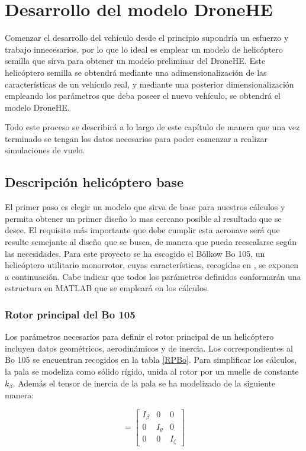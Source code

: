\chapter{Desarrollo del modelo DroneHE}


Comenzar el desarrollo del vehículo desde el principio supondría un esfuerzo y trabajo innecesarios, por lo que lo ideal es emplear un modelo de helicóptero semilla que sirva para obtener un modelo preliminar del DroneHE. Este helicóptero semilla se obtendrá mediante una adimensionalización de las características de un vehículo real, y mediante una posterior dimensionalización empleando los parámetros que deba poseer el nuevo vehículo, se obtendrá el modelo DroneHE.

Todo este proceso se describirá a lo largo de este capítulo de manera que una vez terminado se tengan los datos necesarios para poder comenzar a realizar simulaciones de vuelo.

\section{Descripción helicóptero base}

El primer paso es elegir un modelo que sirva de base para nuestros cálculos y permita obtener un primer diseño lo mas cercano posible al resultado que se desee. El requisito más importante que debe cumplir esta aeronave será que resulte semejante al diseño que se busca, de manera que pueda reescalarse según las necesidades. Para este proyecto se ha escogido el Bölkow Bo 105, un helicóptero utilitario monorrotor, cuyas características, recogidas en \citet{Padfield}, se exponen a continuación. Cabe indicar que todos los parámetros definidos conformarán una estructura en MATLAB que se empleará en los cálculos.

\subsection{Rotor principal del Bo 105}

Los parámetros necesarios para definir el rotor principal de un helicóptero incluyen datos geométricos, aerodinámicos y de inercia. Los correspondientes al Bo 105 se encuentran recogidos en la tabla \ref{RPBo}.
Para simplificar los cálculos, la pala se modeliza como sólido rígido, unida al rotor por un muelle de constante $k_\beta$.
Además el tensor de inercia de la pala se ha modelizado de la siguiente manera:

\begin{equation}
[I_B]=\left[	
\begin{array}{ccc}
I_\beta & 0 & 0\\
0 & I_\theta & 0\\
0 & 0 & I_\zeta
\end{array}
\right]
\end{equation}

